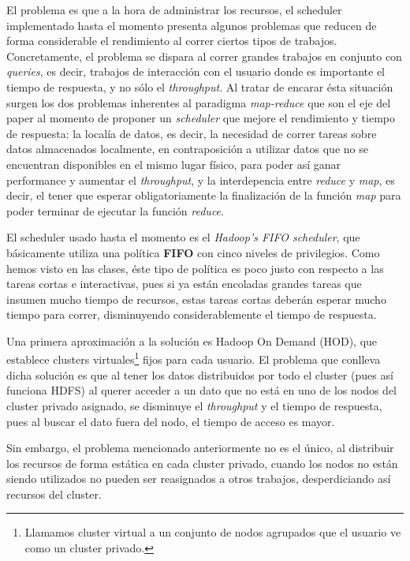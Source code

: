 \documentclass[a4paper]{article}
\begin{document}
El problema es que a la hora de administrar los recursos, el scheduler
implementado hasta el momento presenta algunos problemas que reducen de forma
considerable el rendimiento al correr ciertos tipos de trabajos. Concretamente,
el problema se dispara al correr grandes trabajos en conjunto con
\textit{queries}, es decir, trabajos de interacción con el usuario donde es
importante el tiempo de respuesta, y no sólo el \textit{throughput}. Al tratar
de encarar ésta situación surgen los dos problemas inherentes al paradigma
\textit{map-reduce} que son el eje del paper al momento de proponer un
\textit{scheduler} que mejore el rendimiento y tiempo de respuesta: la
localía de datos, es decir, la necesidad de correr tareas sobre datos
almacenados localmente, en contraposición a utilizar datos que no se encuentran
disponibles en el mismo lugar físico, para poder así ganar performance y
aumentar el \textit{throughput}, y la interdepencia entre \textit{reduce} y
\textit{map}, es decir, el tener que esperar obligatoriamente la finalización
de la función \textit{map} para poder terminar de ejecutar la función
\textit{reduce}.

El scheduler usado hasta el momento es el \textit{Hadoop's FIFO scheduler}, que
básicamente utiliza una política \textbf{FIFO} con cinco niveles de
privilegios.  Como hemos visto en las clases, éste tipo de política es poco
justo con respecto a las tareas cortas e interactivas, pues si ya están
encoladas grandes tareas que insumen mucho tiempo de recursos, estas tareas
cortas deberán esperar mucho tiempo para correr, disminuyendo considerablemente
el tiempo de respuesta.

Una primera aproximación a la solución es Hadoop On Demand (HOD), que establece
clusters virtuales\footnote{Llamamos cluster virtual a un conjunto de nodos
agrupados que el usuario ve como un cluster privado.} fijos para cada usuario.
El problema que conlleva dicha solución es que al tener los datos distribuidos
por todo el cluster (pues así funciona HDFS) al querer acceder a un dato que no
está en uno de los nodos del cluster privado asignado, se disminuye el
\textit{throughput} y el tiempo de respuesta, pues al buscar el dato fuera del
nodo, el tiempo de acceso es mayor.

Sin embargo, el problema mencionado anteriormente no es el único, al distribuir
los recursos de forma estática en cada cluster privado, cuando los nodos no
están siendo utilizados no pueden ser reasignados a otros trabajos,
desperdiciando así recursos del cluster.
\end{document}
